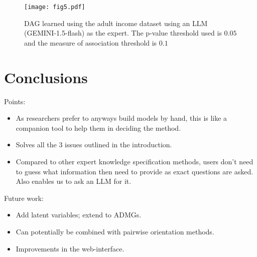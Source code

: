 \documentclass{uai2025} %
\begin{document}
\begin{figure}[t!]
	\centering
	\texttt{[image: fig5.pdf]}
	\caption{DAG learned using the adult income dataset using an LLM (GEMINI-1.5-flash) as the expert. The p-value threshold used is $ 0.05 $ and the measure of association threshold is $ 0. 1 $}
	\label{fig:adult_llm}
\end{figure}

\section{Conclusions}

Points:
\begin{itemize}
	\item As researchers prefer to anyways build models by hand, this is like a companion tool to help them in deciding the method.
	\item Solves all the $ 3 $ issues outlined in the introduction.
	\item Compared to other expert knowledge specification methods, users don't need to guess what information then need to provide as exact questions are asked. Also enables us to ask an LLM for it.
\end{itemize}

Future work:
\begin{itemize}
	\item Add latent variables; extend to ADMGs.
	\item Can potentially be combined with pairwise orientation methods.
	\item Improvements in the web-interface.
\end{itemize}



\newpage


\end{document}
